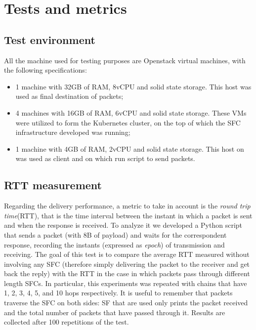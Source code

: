 \chapter{Tests and metrics}
\label{chap:tests}

\section{Test environment}
All the machine used for testing purposes are Openstack virtual machines, with
the following specifications:
\begin{itemize}
\item 1 machine with 32GB of RAM, 8vCPU and solid state storage. This host was
used as final destination of packets;
\item 4 machines with 16GB of RAM, 6vCPU and solid state storage. These VMs
were utilized to form the Kubernetes cluster, on the top of which the SFC
infrastructure developed was running;
\item 1 machine with 4GB of RAM, 2vCPU and solid state storage. This host on
was used as client and on which run script to send packets.
\end{itemize}

\section{RTT measurement}
Regarding the delivery performance, a metric to take in account is the
\emph{round trip time}(RTT), that is the time interval between the instant in
which a packet is sent and when the response is received. To analyze it we
developed a Python script that sends a packet (with 8B of payload) and waits for
the correspondent response, recording the instants (expressed as \emph{epoch})
of transmission and receiving. The goal of this test is to compare the average
RTT measured without involving any SFC (therefore simply delivering the packet
to the receiver and get back the reply) with the RTT in the case in which
packets pass through different length SFCs. In particular, this experiments was
repeated with chains that have 1, 2, 3, 4, 5, and 10 hops respectively. It is
useful to remember that packets traverse the SFC on both sides: SF that are
used only prints the packet received and the total number of packets that have
passed through it. Results are collected after 100 repetitions of the test.

